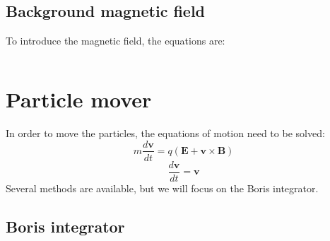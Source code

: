 \documentclass[a4paper]{report}
\newcommand*\V[1]{\bm{#1}}
\newcommand{\E}{\V{E}}
\newcommand{\B}{\V{B}}
\renewcommand*{\v}{\V{v}}
\begin{document}
\subsection{Background magnetic field}

To introduce the magnetic field, the equations are:

$$ $$

\section{Particle mover}

In order to move the particles, the equations of motion need to be solved:
%
\begin{equation}
m \frac{d\v}{dt} = q (\E + \v \times \B)
\end{equation}
\begin{equation}
\frac{d\v}{dt}=\v
\end{equation}
%
Several methods are available, but we will focus on the Boris integrator.

\subsection{Boris integrator}
\end{document}
